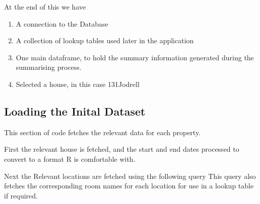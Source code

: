 \documentclass[10pt,a4paper]{article}\usepackage{graphicx, color}
\begin{document}
At the end of this we have 
\begin{enumerate}
\item A connection to the Database
\item  A collection of lookup tables used later in the application
\item  One main dataframe, to hold the summary information generated during the
summarising process.
\item  Selected a house, in this case 131Jodrell
\end{enumerate}

\subsection{Loading the Inital Dataset}

This section of code fetches the relevant data for each property.

First the relevant house is fetched, and the start and end dates processed to
convert to a format R is comfortable with.

Next the Relevant locations are fetched using the following query
This query also fetches the corresponding room names for each location for use
in a lookup table if required.
\end{document}
